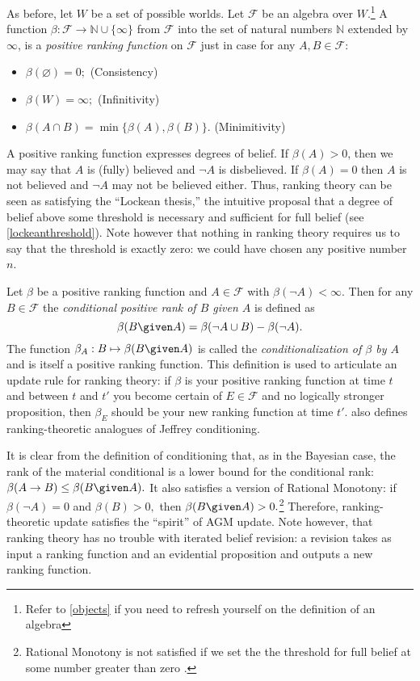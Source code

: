 As before, let $W$ be a set of possible worlds. Let $\mathcal{F}$ be an algebra
over $W$.\footnote{Refer to \autoref{objects} if you need to refresh yourself on
the definition of an algebra} A function $\beta: \mathcal{F} \rightarrow
\mathbb{N} \cup \{\infty\}$ from $\mathcal{F}$ into the set of natural numbers
$\mathbb{N}$ extended by $\infty$, is a {\em positive ranking function} on
$\mathcal{F}$ just in case for any $A,B\in\mathcal{F}$: 
\begin{itemize}
\item[] $\beta(\varnothing)=0;$ \hfill(Consistency)
\item[] $\beta(W)=\infty;$ \hfill(Infinitivity)
\item[] $\beta(A\cap B)=\min \{ \beta(A), \beta(B)\}.$ \hfill(Minimitivity)
\end{itemize}
A positive ranking function expresses degrees of belief. If $\beta(A)>0$, then
we may say that $A$ is (fully) believed and $\neg A$ is disbelieved. If
$\beta(A)=0$ then $A$ is not believed and $\neg A$ may not be believed either.
Thus, ranking theory can be seen as satisfying the ``Lockean thesis,'' the
intuitive proposal that a degree of belief above some threshold is necessary and
sufficient for full belief (see \autoref{lockeanthreshold}). Note however that
nothing in ranking theory requires us to say that the threshold is exactly zero:
we could have chosen any positive number $n$. 

Let $\beta$ be a positive ranking function and $A\in \mathcal{F}$ with
$\beta(\neg A) < \infty.$ Then for any $B\in\mathcal{F}$ the {\em conditional
positive rank of $B$ given $A$} is defined as $$ \beta(B \given A) = \beta(\neg
A \cup B) - \beta(\neg A).$$ The function $\beta_A : B \mapsto \beta(B \given
A)$ is called the {\em conditionalization of $\beta$ by $A$} and is itself a
positive ranking function. This definition is used to articulate an update rule
for ranking theory: if $\beta$ is your positive ranking function at time $t$ and
between $t$ and $t'$ you become certain of $E\in\mathcal{F}$ and no logically
stronger proposition, then $\beta_E$ should be your new ranking function at time
$t'.$ \citet{spohn1988ordinal} also defines ranking-theoretic analogues of
Jeffrey conditioning.

It is clear from the definition of conditioning that, as in the Bayesian case,
the rank of the material conditional is a lower bound for the conditional rank:
$\beta(A\rightarrow B) \leq \beta(B \given A).$ It also satisfies a version of
Rational Monotony: if $\beta(\neg A)=0$ and $\beta(B)>0,$ then $\beta(B \given
A)>0.$\footnote{Rational Monotony is not satisfied if we set the the threshold for 
full belief at some number greater than zero \citep[footnote 26]{raidl2018completeness}.}
Therefore, ranking-theoretic
update satisfies the ``spirit'' of AGM update. Note however, that ranking theory
has no trouble with iterated belief revision: a revision takes as input a
ranking function and an evidential proposition and outputs a new ranking
function.

